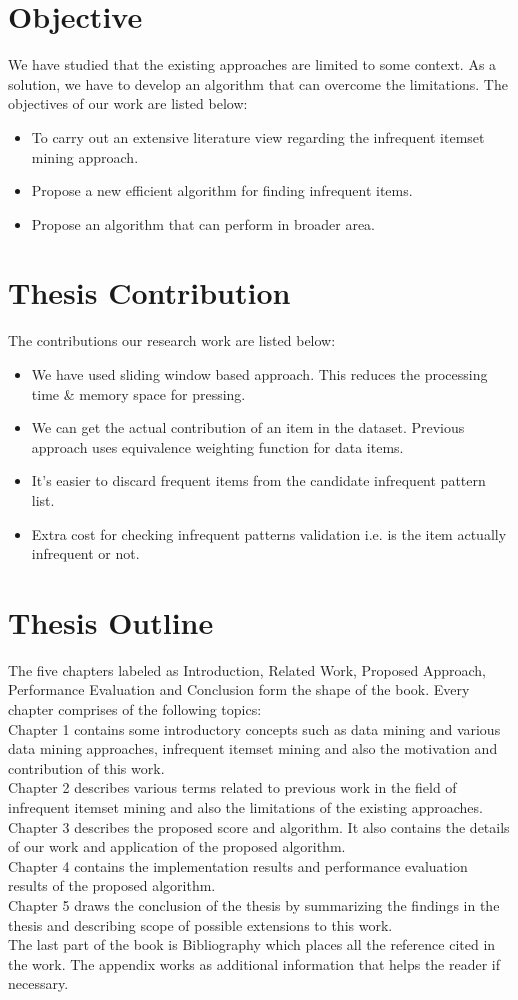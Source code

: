 \section{Objective}
%
We have studied that the existing approaches are limited to some context. As a solution, we have to develop an algorithm that can overcome the limitations. The objectives of our work are listed below:
%
\begin{itemize}
\item To carry out an extensive literature view regarding the infrequent itemset mining approach.
\item Propose a new efficient algorithm for finding infrequent items. 
\item Propose an algorithm that can perform in broader area.
\end{itemize}
%
\section{Thesis Contribution}
%
The contributions our research work are listed below:
%
\begin{itemize}
%
\item We have used sliding window based approach. This reduces the processing time \& memory space for pressing.
%
\item We can get the actual contribution of an item in the dataset. Previous approach uses equivalence weighting function for data items.
% 
\item It’s easier to discard frequent items from the candidate infrequent pattern list.
\item Extra cost for checking infrequent patterns validation i.e. is the item actually infrequent or not.
%
\end{itemize}
%
\section{Thesis Outline}
The five chapters labeled as Introduction, Related Work, Proposed Approach, Performance Evaluation and Conclusion form the shape of the book.
Every chapter comprises of the following topics: \\
%
Chapter 1 contains some introductory concepts such as data mining and various data mining approaches, infrequent itemset mining and also the motivation and contribution of this work.\\
%
Chapter 2 describes various terms related to previous work in the field of infrequent itemset mining and also the limitations of the existing approaches. \\
%
Chapter 3 describes the proposed score and algorithm. It also contains the details of our work and application of the proposed algorithm. \\
%
Chapter 4 contains the implementation results and performance evaluation results of the proposed algorithm. \\
%
Chapter 5 draws the conclusion of the thesis by summarizing the
findings in the thesis and describing scope of possible extensions to this work. \\
%
The last part of the book is Bibliography which places all the reference cited in the work. The appendix works as additional information that helps the reader if necessary.
%
